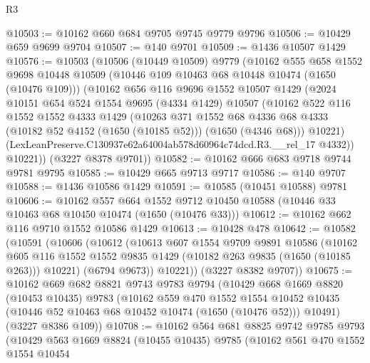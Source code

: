 \begin{lexlean}{R3}
\begin{coremodule}
@10503 := @10162 @660 @684 @9705 @9745 @9779 @9796
@10506 := @10429 @659 @9699 @9704
@10507 := @140 @9701
@10509 := @1436 @10507 @1429
@10576 := @10503
    (@10506
      (@10449 @10509)
      @9779
      (@10162
        @555
        @658
        @1552
        @9698
        @10448
        @10509
        (@10446 @109 @10463 @68 @10448 @10474 (@1650 (@10476 @109)))
        (@10162
          @656
          @116
          @9696
          @1552
          @10507
          @1429
          (@2024
            @10151
            @654
            @524
            @1554
            @9695
            (@4334 @1429)
            @10507
            (@10162
              @522
              @116
              @1552
              @1552
              @4333
              @1429
              (@10263
                @371
                @1552
                @68
                @4336
                @68
                @4333
                (@10182 @52 @4152 (@1650 (@10185 @52)))
                (@1650 (@4346 @68)))
              @10221)
            (LexLeanPreserve.C130937e62a64004ab578d60964c74dcd.R3.__rel_17 @4332))
          @10221))
      (@3227 @8378 @9701))
@10582 := @10162 @666 @683 @9718 @9744 @9781 @9795
@10585 := @10429 @665 @9713 @9717
@10586 := @140 @9707
@10588 := @1436 @10586 @1429
@10591 := @10585 (@10451 @10588) @9781
@10606 := @10162
    @557
    @664
    @1552
    @9712
    @10450
    @10588
    (@10446 @33 @10463 @68 @10450 @10474 (@1650 (@10476 @33)))
@10612 := @10162 @662 @116 @9710 @1552 @10586 @1429
@10613 := @10428 @478
@10642 := @10582
    (@10591
      (@10606
        (@10612
          (@10613
            @607
            @1554
            @9709
            @9891
            @10586
            (@10162
              @605
              @116
              @1552
              @1552
              @9835
              @1429
              (@10182 @263 @9835 (@1650 (@10185 @263)))
              @10221)
            (@6794 @9673))
          @10221))
      (@3227 @8382 @9707))
@10675 := @10162
    @669
    @682
    @8821
    @9743
    @9783
    @9794
    (@10429
      @668
      @1669
      @8820
      (@10453 @10435)
      @9783
      (@10162
        @559
        @470
        @1552
        @1554
        @10452
        @10435
        (@10446 @52 @10463 @68 @10452 @10474 (@1650 (@10476 @52)))
        @10491)
      (@3227 @8386 @109))
@10708 := @10162
    @564
    @681
    @8825
    @9742
    @9785
    @9793
    (@10429
      @563
      @1669
      @8824
      (@10455 @10435)
      @9785
      (@10162
        @561
        @470
        @1552
        @1554
        @10454

\end{coremodule}
\end{lexlean}

